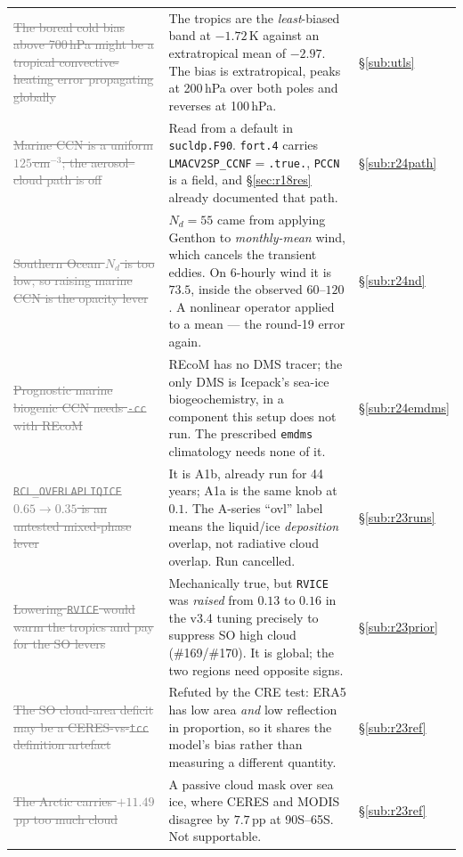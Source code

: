 \documentclass[10pt]{article}
\newcommand{\dead}[1]{\textcolor{gray}{\sout{#1}}}
\begin{document}
\begin{center}
\begin{tabular}{p{} p{} l}
\dead{The boreal cold bias above 700\,hPa might be a tropical convective-heating error
propagating globally} &
The tropics are the \emph{least}-biased band at $-1.72$\,K against an extratropical mean of
$-2.97$. The bias is extratropical, peaks at 200\,hPa over both poles and reverses at
100\,hPa. & \S\ref{sub:utls} \\
\dead{Marine CCN is a uniform $125$\,cm$^{-3}$; the aerosol--cloud path is off} &
Read from a default in \texttt{sucldp.F90}. \texttt{fort.4} carries
\texttt{LMACV2SP\_CCNF}$=$\texttt{.true.}, \texttt{PCCN} is a field, and \S\ref{sec:r18res}
already documented that path. & \S\ref{sub:r24path} \\
\dead{Southern Ocean $N_d$ is too low, so raising marine CCN is the opacity lever} &
$N_d=55$ came from applying Genthon to \emph{monthly-mean} wind, which cancels the
transient eddies. On 6-hourly wind it is $73.5$, inside the observed $60$--$120$. A
nonlinear operator applied to a mean --- the round-19 error again. & \S\ref{sub:r24nd} \\
\dead{Prognostic marine biogenic CCN needs \texttt{-cc} with REcoM} &
REcoM has no DMS tracer; the only DMS is Icepack's sea-ice biogeochemistry, in a component
this setup does not run. The prescribed \texttt{emdms} climatology needs none of it.
& \S\ref{sub:r24emdms} \\
\dead{\texttt{RCL\_OVERLAPLIQICE} $0.65\to0.35$ is an untested mixed-phase lever} &
It is A1b, already run for 44 years; A1a is the same knob at $0.1$. The A-series ``ovl'' label
means the liquid/ice \emph{deposition} overlap, not radiative cloud overlap. Run cancelled.
& \S\ref{sub:r23runs} \\
\dead{Lowering \texttt{RVICE} would warm the tropics and pay for the SO levers} &
Mechanically true, but \texttt{RVICE} was \emph{raised} from $0.13$ to $0.16$ in the v3.4
tuning precisely to suppress SO high cloud (\#169/\#170). It is global; the two regions need
opposite signs. & \S\ref{sub:r23prior} \\
\dead{The SO cloud-area deficit may be a CERES-vs-\texttt{tcc} definition artefact} &
Refuted by the CRE test: ERA5 has low area \emph{and} low reflection in proportion, so it
shares the model's bias rather than measuring a different quantity. & \S\ref{sub:r23ref} \\
\dead{The Arctic carries $+11.49$\,pp too much cloud} &
A passive cloud mask over sea ice, where CERES and MODIS disagree by $7.7$\,pp at 90S--65S.
Not supportable. & \S\ref{sub:r23ref} \\

\end{tabular}
\end{center}
\end{document}
